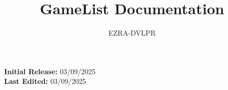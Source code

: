 \documentclass[letterpaper,12pt]{article}
\begin{document}
%
   \title{GameList Documentation}

   \author{EZRA-DVLPR}
          
	\date{} %

   \maketitle

\begin{center}
	\textbf{Initial Release:} 03/09/2025\\
	\textbf{Last Edited:} 03/09/2025\\
\end{center}
   
   \tableofcontents
 
  \newpage
    

\end{document}
